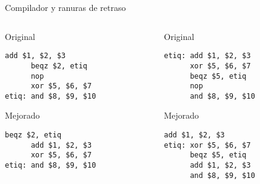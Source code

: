 \begin{frame}[t,fragile]{Compilador y ranuras de retraso}
\begin{columns}[T]

\begin{column}{.33\textwidth}
\begin{block}{Original}
\begin{lstlisting}[language={generalasm},basicstyle=\scriptsize]
      add $1, $2, $3
      beqz $2, etiq
      nop
      xor $5, $6, $7
etiq: and $8, $9, $10
\end{lstlisting}
\end{block}
\begin{block}{Mejorado}
\begin{lstlisting}[language={generalasm},basicstyle=\scriptsize]
      beqz $2, etiq
      add $1, $2, $3
      xor $5, $6, $7
etiq: and $8, $9, $10
\end{lstlisting}
\end{block}
\end{column}


\begin{column}{.33\textwidth}
\begin{block}{Original}
\begin{lstlisting}[language={generalasm},basicstyle=\scriptsize]
etiq: add $1, $2, $3
      xor $5, $6, $7
      beqz $5, etiq
      nop
      and $8, $9, $10
\end{lstlisting}
\end{block}
\begin{block}{Mejorado}
\begin{lstlisting}[language={generalasm},basicstyle=\scriptsize]
      add $1, $2, $3
etiq: xor $5, $6, $7
      beqz $5, etiq
      add $1, $2, $3
      and $8, $9, $10
\end{lstlisting}
\end{block}
\end{column}



\end{columns}
\end{frame}
